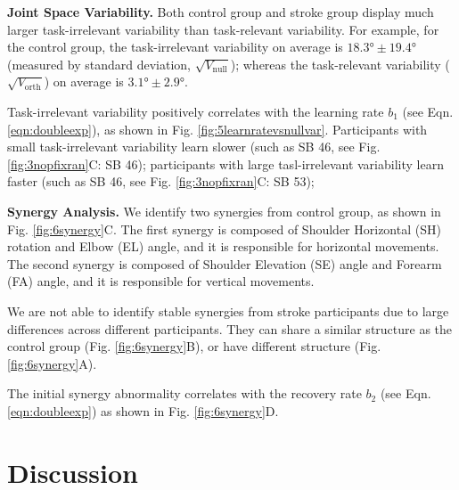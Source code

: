 \textbf{Joint Space Variability.}
Both control group and stroke group display much larger task-irrelevant variability than task-relevant variability.
For example, for the control group, the task-irrelevant variability on average is $ \ang{18.3} \pm \ang{19.4} $ (measured by standard deviation, $ \sqrt{V_\text{null}} $); whereas the task-relevant variability ($ \sqrt{V_\text{orth}} $) on average is $ \ang{3.1} \pm \ang{2.9} $.

Task-irrelevant variability positively correlates with the learning rate $ b_1 $ (see Eqn. \ref{eqn:doubleexp}), as shown in Fig. \ref{fig:5learnratevsnullvar}.
Participants with small task-irrelevant variability learn slower (such as SB 46, see Fig. \ref{fig:3nopfixran}C: SB 46);
participants with large tasl-irrelevant variability learn faster (such as SB 46, see Fig. \ref{fig:3nopfixran}C: SB 53);

\textbf{Synergy Analysis.}
We identify two synergies from control group, as shown in Fig. \ref{fig:6synergy}C.
The first synergy is composed of Shoulder Horizontal (SH) rotation and Elbow (EL) angle, and it is responsible for horizontal movements.
The second synergy is composed of Shoulder Elevation (SE) angle and Forearm (FA) angle, and it is responsible for vertical movements.

We are not able to identify stable synergies from stroke participants due to large differences across different participants.
They can share a similar structure as the control group (Fig. \ref{fig:6synergy}B), or have different structure (Fig. \ref{fig:6synergy}A).

The initial synergy abnormality correlates with the recovery rate $ b_2 $ (see Eqn. \ref{eqn:doubleexp}) as shown in Fig. \ref{fig:6synergy}D.


\section{Discussion}




